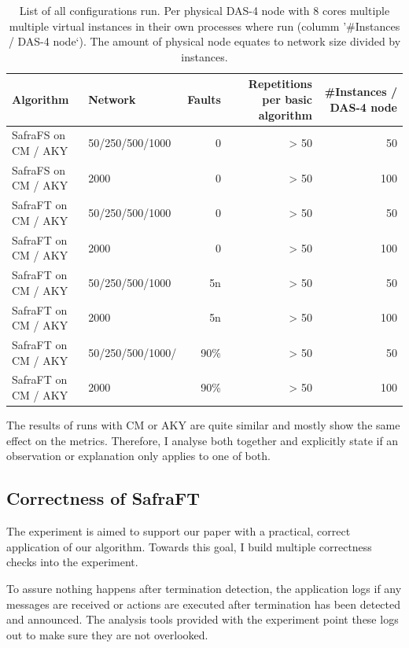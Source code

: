 \begin{table}[]
	\centering
	\begin{tabular}{@{}llrrr@{}}
		\toprule
		Algorithm & Network    & Faults               & Repetitions per basic algorithm  & \#Instances / DAS-4 node   \\ \midrule
		SafraFS on CM / AKY  & 50/250/500/1000      & 0      & > 50          & 50                    \\
		SafraFS on CM / AKY  & 2000                 & 0      & > 50          & 100                   \\
		SafraFT on CM / AKY  & 50/250/500/1000      & 0      & > 50          & 50                    \\
		SafraFT on CM / AKY  & 2000                 & 0      & > 50          & 100                   \\
		SafraFT on CM / AKY  & 50/250/500/1000      & 5n     & > 50          & 50                    \\
		SafraFT on CM / AKY  &    2000              & 5n     & > 50          & 100                   \\
		SafraFT on CM / AKY  & 50/250/500/1000/     & 90\%   & > 50          & 50                    \\
		SafraFT on CM / AKY  &    2000              & 90\%   & > 50          & 100                   \\ \bottomrule
	\end{tabular}
	\caption{List of all configurations run. Per physical DAS-4 node with 8 cores multiple multiple virtual instances in their own processes where run (columm '\#Instances / DAS-4 node`). The amount of physical node equates to network size divided by instances.}
	\label{table:runs}
\end{table}

The results of runs with CM or AKY are quite similar and mostly show the same effect on the metrics.
Therefore, I analyse both together and explicitly state if an observation or explanation only applies to one of both.

\subsection{Correctness of SafraFT}
\label{ssec:correctness}
\label{extended-definition}
The experiment is aimed to support our paper with a practical, correct application of our algorithm.
Towards this goal, I build multiple correctness checks into the experiment.

To assure nothing happens after termination detection, the application logs if any messages are received or actions are executed after termination has been detected and announced.
The analysis tools provided with the experiment point these logs out to make sure they are not overlooked.


